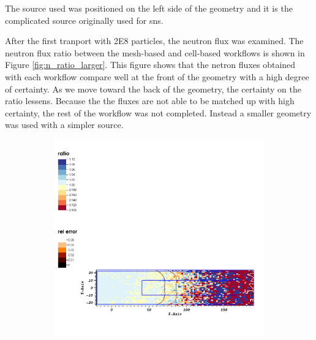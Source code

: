 The source used was positioned on the left side of the geometry and it 
is the complicated source originally used for \gls{sns}. 


After the first tranport with 2E8 particles, the neutron flux was examined. 
The neutron flux ratio between the mesh-based and cell-based workflows 
is shown in Figure \ref{fig:n_ratio_larger}. 
This figure shows that the netron fluxes obtained with each workflow 
compare well at the front of the geometry with a high degree of certainty. 
As we move toward the back of the geometry, the certainty on the 
ratio lessens. 
Because the the fluxes are not able to be matched up with high certainty, 
the rest of the workflow was not completed. 
Instead a smaller geometry was used with a simpler source.  

\begin{figure}
    \begin{subfigure}{0.1\textwidth}
        \centering
        \includegraphics[scale=0.35, trim={0cm 20cm 31cm 2cm}, clip]{figs/ratio_nflux_larger.png}
    \end{subfigure}
    \begin{subfigure}{0.1\textwidth}
        \centering

\end{subfigure}
\end{figure}

